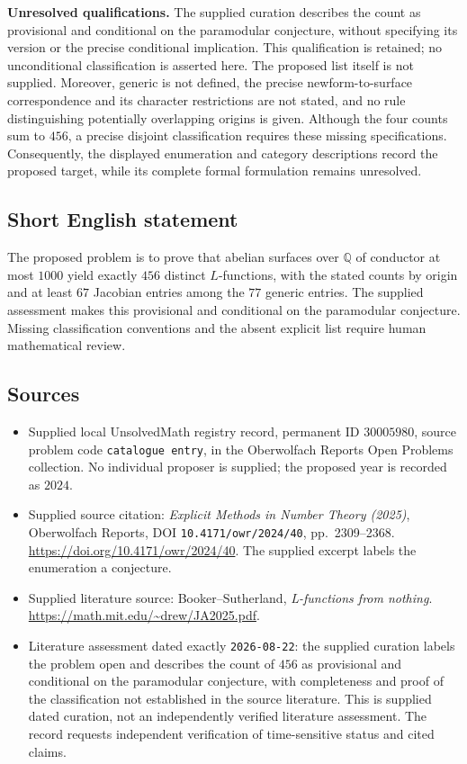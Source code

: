 \documentclass[11pt]{article}
\newcommand{\Q}{\mathbb{Q}}
\begin{document}
\textbf{Unresolved qualifications.} The supplied curation describes the count as provisional and conditional on the paramodular conjecture, without specifying its version or the precise conditional implication. This qualification is retained; no unconditional classification is asserted here. The proposed list itself is not supplied. Moreover, generic is not defined, the precise newform-to-surface correspondence and its character restrictions are not stated, and no rule distinguishing potentially overlapping origins is given. Although the four counts sum to \(456\), a precise disjoint classification requires these missing specifications. Consequently, the displayed enumeration and category descriptions record the proposed target, while its complete formal formulation remains unresolved.
\subsection{Short English statement}
The proposed problem is to prove that abelian surfaces over \(\Q\) of conductor at most \(1000\) yield exactly \(456\) distinct \(L\)-functions, with the stated counts by origin and at least \(67\) Jacobian entries among the \(77\) generic entries. The supplied assessment makes this provisional and conditional on the paramodular conjecture. Missing classification conventions and the absent explicit list require human mathematical review.
\subsection{Sources}
\begin{itemize}
\item Supplied local UnsolvedMath registry record, permanent ID \(30005980\), source problem code \texttt{catalogue entry}, in the Oberwolfach Reports Open Problems collection. No individual proposer is supplied; the proposed year is recorded as \(2024\).
\item Supplied source citation: \emph{Explicit Methods in Number Theory (2025)}, Oberwolfach Reports, DOI \texttt{10.4171/owr/2024/40}, pp.\ 2309--2368. \url{https://doi.org/10.4171/owr/2024/40}. The supplied excerpt labels the enumeration a conjecture.
\item Supplied literature source: Booker--Sutherland, \emph{L-functions from nothing}. \url{https://math.mit.edu/~drew/JA2025.pdf}.
\item Literature assessment dated exactly \texttt{2026-08-22}: the supplied curation labels the problem open and describes the count of \(456\) as provisional and conditional on the paramodular conjecture, with completeness and proof of the classification not established in the source literature. This is supplied dated curation, not an independently verified literature assessment. The record requests independent verification of time-sensitive status and cited claims.
\end{itemize}
\end{document}
